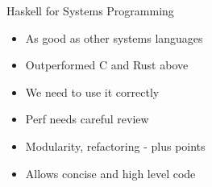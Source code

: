 \documentclass[17pt]{beamer}
\begin{document}
\begin{frame}{Haskell for Systems Programming}{}
\begin{itemize}
  \item As good as other systems languages
  \item Outperformed C and Rust above
  \item We need to use it correctly
  \item Perf needs careful review
  \item Modularity, refactoring - plus points
  \item Allows concise and high level code
\end{itemize}
\end{frame}

\begin{frame}{}
\end{frame}

\end{document}
